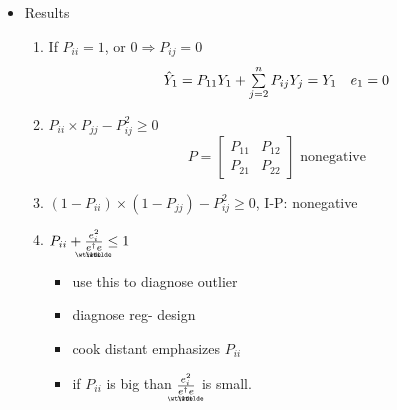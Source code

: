 \documentclass{article}
\begin{document}
\begin{itemize}
\item Results

\begin{enumerate}
\item If $P_{ii}=1$, or $0\Rightarrow P_{ij}=0$%
\begin{equation*}
\hat{Y}_{1}=P_{11}Y_{1}+\mathop{\textstyle \sum }\limits_{j=2}^{n}P_{ij}Y_{j}=Y_{1}\quad e_{1}=0
\end{equation*}

\item $P_{ii}\times P_{jj}-P_{ij}^{2}\geq 0$%
\begin{equation*}
P=\left[ 
\begin{array}{cc}
P_{11} & P_{12} \\ 
P_{21} & P_{22}%
\end{array}%
\right] \text{ nonegative}
\end{equation*}

\item $\left( 1-P_{ii}\right) \times \left( 1-P_{jj}\right) -P_{ij}^{2}\geq
0 $, I-P: nonegative

\item $P_{ii}+\frac{e_{i}^{2}}{%
\underaccent{\wtilde}{e}%
^{\dagger }%
\underaccent{\wtilde}{e}%
}\leq 1$

\begin{itemize}
\item use this to diagnose outlier

\item diagnose reg- design

\item cook distant emphasizes $P_{ii}$

\item if $P_{ii}$ is big than $\frac{e_{i}^{2}}{%
\underaccent{\wtilde}{e}%
^{\dagger }%
\underaccent{\wtilde}{e}%
}$ is small.
\end{itemize}


\end{enumerate}
\end{itemize}
\end{document}
